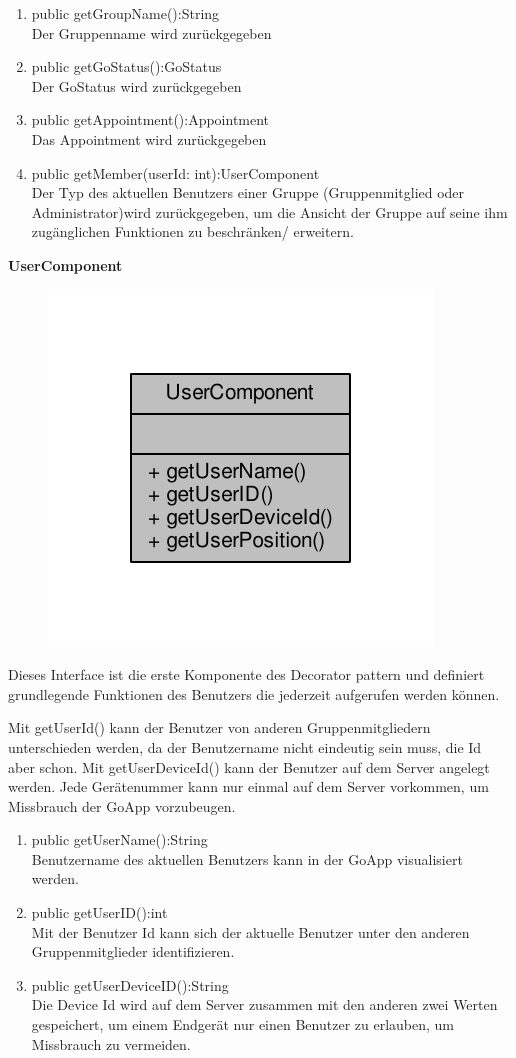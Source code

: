 \begin{enumerate}
	\item public getGroupName():String\\
		Der Gruppenname wird zurückgegeben 
	\item public getGoStatus():GoStatus \\
		Der GoStatus wird zurückgegeben
	\item public getAppointment():Appointment \\
		Das Appointment wird zurückgegeben
	\item public getMember(userId: int):UserComponent \\
		Der Typ des aktuellen Benutzers einer Gruppe (Gruppenmitglied oder Administrator)wird zurückgegeben, um die Ansicht der Gruppe auf seine ihm zugänglichen Funktionen zu beschränken/ erweitern.
\end{enumerate}

\textbf{UserComponent}
\begin{figure}[H]
	\includegraphics[scale = 1]{res/umlClasses/user_component__coll__graph.pdf}
	\centering
\end{figure}
Dieses Interface ist die erste Komponente des Decorator pattern und definiert grundlegende Funktionen des Benutzers die jederzeit aufgerufen werden können. 

Mit getUserId() kann der Benutzer von anderen Gruppenmitgliedern unterschieden werden, da der Benutzername nicht eindeutig sein muss, die Id aber schon.
Mit getUserDeviceId() kann der Benutzer auf dem Server angelegt werden. Jede Gerätenummer kann nur einmal auf dem Server vorkommen, um Missbrauch der GoApp vorzubeugen.
\begin{enumerate}
	\item public getUserName():String\\
		Benutzername des aktuellen Benutzers kann in der GoApp visualisiert werden.
	\item public getUserID():int\\
		Mit der Benutzer Id kann sich der aktuelle Benutzer unter den anderen Gruppenmitglieder identifizieren.
	\item public getUserDeviceID():String\\
		Die Device Id wird auf dem Server zusammen mit den anderen zwei Werten gespeichert, um einem Endgerät nur einen Benutzer zu erlauben, um Missbrauch zu vermeiden.
\end{enumerate}

